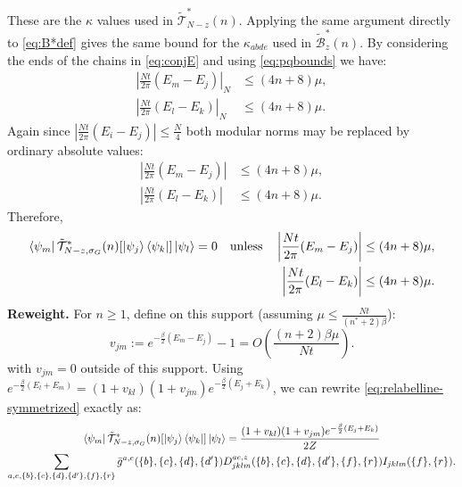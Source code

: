 \documentclass[aps,floatfix,10pt,amssymb,amsfont,amsmath,superscriptaddress,float,nofootinbib,longbibliography,nobalancelastpage,twocolumn]{revtex4-2}
\begin{document}
These are the $\kappa$ values used in $\tilde{\mathcal{T}}^*_{N-z}(n)$. Applying the same argument directly to \eqref{eq:B*def} gives the same bound for the $\kappa_{abde}$ used in $\tilde{\mathcal{B}}^*_z(n)$. By considering the ends of the chains in \eqref{eq:conjE} and using \eqref{eq:pqbounds} we have:
\begin{equation}
\begin{aligned}
    \left|\frac{Nt}{2\pi}(E_m-E_j)\right|_{N}&\leq(4n+8)\mu,\\
    \left|\frac{Nt}{2\pi}(E_l-E_k)\right|_{N}&\leq(4n+8)\mu.
\end{aligned}
\end{equation}
Again since $|\frac{Nt}{2\pi}(E_i - E_j)| \leq \frac{N}{4}$ both modular norms may be replaced by ordinary absolute values:
\begin{equation}
\label{eq:energiessame}
\begin{aligned}
    \left|\frac{Nt}{2\pi}(E_m-E_j)\right|&\leq(4n+8)\mu,\\
    \left|\frac{Nt}{2\pi}(E_l-E_k)\right|&\leq(4n+8)\mu.
\end{aligned}
\end{equation}
Therefore,
\begin{equation}
\begin{aligned}
    \bra{\psi_m}\tilde{\mathcal{T}}^*_{N -z,\sigma_G}(n)[\ket{\psi_j}\bra{\psi_k}]\ket{\psi_l}=0\quad\text{unless}\quad
    \left|\frac{Nt}{2\pi}(E_m-E_j)\right|&\leq(4n+8)\mu,\\
    \left|\frac{Nt}{2\pi}(E_l-E_k)\right|&\leq(4n+8)\mu.
    \label{eq:Bsupport}
\end{aligned}
\end{equation}
\textbf{Reweight.} For $n\geq1$, define on this support (assuming $\mu \leq \frac{Nt}{(n^*+2)\beta}$):
\begin{equation*}
    v_{jm}:=e^{-\frac{\beta}{2}(E_m-E_j)}-1=O(\frac{(n+2)\beta \mu}{Nt}).
\end{equation*}
with $v_{jm}=0$ outside of this support.
Using $e^{-\frac{\beta}{2}(E_l+E_m)}=(1+v_{kl})(1+v_{jm})e^{-\frac{\beta}{2}(E_j+E_k)}$, we can rewrite \eqref{eq:relabelline-symmetrized} exactly as:
\begin{multline}
    \bra{\psi_m}\tilde{\mathcal{T}}^*_{N -z,\sigma_G}(n)[\ket{\psi_j}\bra{\psi_k}]\ket{\psi_l} =  \frac{(1+v_{kl})(1+v_{jm})e^{-\frac{\beta}{2}(E_j+E_k)}}{2Z}\\\sum_{a,e,\{b\},\{c\},\{d\},\{d'\},\{f\},\{r\}} \bar g^{a,e}(\{b\},\{c\},\{d\},\{d'\}) D^{ae,z}_{jklm}(\{b\},\{c\},\{d\},\{d'\},\{f\},\{r\})I_{jklm}(\{f\},\{r\}).
\end{multline}
\end{document}
